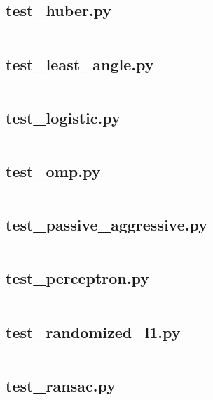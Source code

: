 \documentclass{article}
\begin{document}
\subsection{test\_huber.py}
\inputminted{python}{/home/dufferzafar/dev/@clones/scikit-learn/sklearn/linear_model/tests/test_huber.py}
\newpage

\subsection{test\_least\_angle.py}
\inputminted{python}{/home/dufferzafar/dev/@clones/scikit-learn/sklearn/linear_model/tests/test_least_angle.py}
\newpage

\subsection{test\_logistic.py}
\inputminted{python}{/home/dufferzafar/dev/@clones/scikit-learn/sklearn/linear_model/tests/test_logistic.py}
\newpage

\subsection{test\_omp.py}
\inputminted{python}{/home/dufferzafar/dev/@clones/scikit-learn/sklearn/linear_model/tests/test_omp.py}
\newpage

\subsection{test\_passive\_aggressive.py}
\inputminted{python}{/home/dufferzafar/dev/@clones/scikit-learn/sklearn/linear_model/tests/test_passive_aggressive.py}
\newpage

\subsection{test\_perceptron.py}
\inputminted{python}{/home/dufferzafar/dev/@clones/scikit-learn/sklearn/linear_model/tests/test_perceptron.py}
\newpage

\subsection{test\_randomized\_l1.py}
\inputminted{python}{/home/dufferzafar/dev/@clones/scikit-learn/sklearn/linear_model/tests/test_randomized_l1.py}
\newpage

\subsection{test\_ransac.py}
\inputminted{python}{/home/dufferzafar/dev/@clones/scikit-learn/sklearn/linear_model/tests/test_ransac.py}
\newpage
\end{document}
